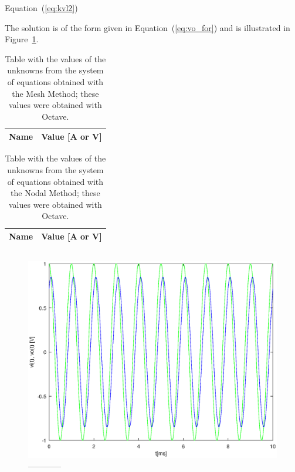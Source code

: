 Equation~(\ref{eq:kvl2}) 

The solution is of the form given in Equation~(\ref{eq:vo_for}) and is
illustrated in Figure~\ref{fig:forced}.





\begin{table}[h]
  \centering
  \begin{tabular}{|l|r|}
    \hline    
    {\bf Name} & {\bf Value [A or V]} \\ \hline
    
  \end{tabular}
  \caption{Table with the values of the unknowns from the system of equations obtained with the Mesh Method; these values were obtained with Octave. }
  \label{tab:op}
\end{table}

\begin{table}[h]
  \centering
  \begin{tabular}{|l|r|}
    \hline    
    {\bf Name} & {\bf Value [A or V]} \\ \hline
    
  \end{tabular}
  \caption{Table with the values of the unknowns from the system of equations obtained with the Nodal Method; these values were obtained with Octave.}
  \label{tab:op}
\end{table}




\begin{equation}
  
  \label{eq:vo_for}
\end{equation}

\begin{figure}[h] \centering
\includegraphics[width=0.8\linewidth]{forced.eps}
\caption{------------}
\label{fig:forced}
\end{figure}
